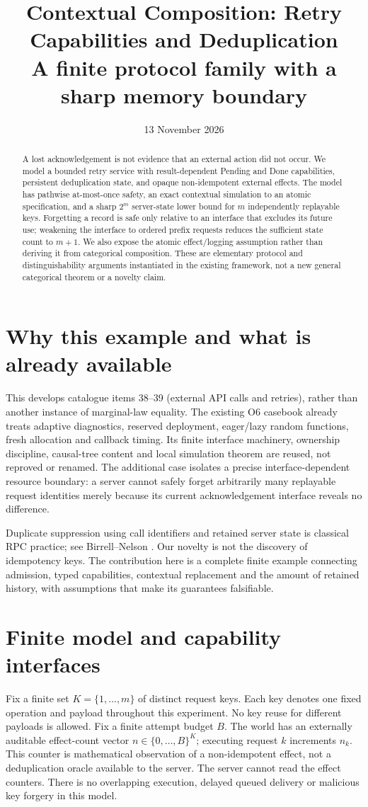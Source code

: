 \documentclass[11pt]{article}
\title{Contextual Composition: Retry Capabilities and Deduplication\\\large A finite protocol family with a sharp memory boundary}
\author{}
\date{13 November 2026}
\begin{document}
\maketitle
\begin{abstract}
A lost acknowledgement is not evidence that an external action did not occur. We model a bounded retry service with result-dependent Pending and Done capabilities, persistent deduplication state, and opaque non-idempotent external effects. The model has pathwise at-most-once safety, an exact contextual simulation to an atomic specification, and a sharp $2^m$ server-state lower bound for $m$ independently replayable keys. Forgetting a record is safe only relative to an interface that excludes its future use; weakening the interface to ordered prefix requests reduces the sufficient state count to $m+1$. We also expose the atomic effect/logging assumption rather than deriving it from categorical composition. These are elementary protocol and distinguishability arguments instantiated in the existing framework, not a new general categorical theorem or a novelty claim.
\end{abstract}

\section{Why this example and what is already available}
This develops catalogue items 38--39 (external API calls and retries), rather than another instance of marginal-law equality. The existing O6 casebook already treats adaptive diagnostics, reserved deployment, eager/lazy random functions, fresh allocation and callback timing. Its finite interface machinery, ownership discipline, causal-tree content and local simulation theorem are reused, not reproved or renamed. The additional case isolates a precise interface-dependent resource boundary: a server cannot safely forget arbitrarily many replayable request identities merely because its current acknowledgement interface reveals no difference.

Duplicate suppression using call identifiers and retained server state is classical RPC practice; see Birrell--Nelson \cite{BN}. Our novelty is not the discovery of idempotency keys. The contribution here is a complete finite example connecting admission, typed capabilities, contextual replacement and the amount of retained history, with assumptions that make its guarantees falsifiable.

\section{Finite model and capability interfaces}
Fix a finite set $K=\{1,\ldots,m\}$ of distinct request keys. Each key denotes one fixed operation and payload throughout this experiment. No key reuse for different payloads is allowed. Fix a finite attempt budget $B$. The world has an externally auditable effect-count vector $n\in\{0,\ldots,B\}^K$; executing request $k$ increments $n_k$. This counter is mathematical observation of a non-idempotent effect, not a deduplication oracle available to the server. The server cannot read the effect counters. There is no overlapping execution, delayed queued delivery or malicious key forgery in this model.
\end{document}
